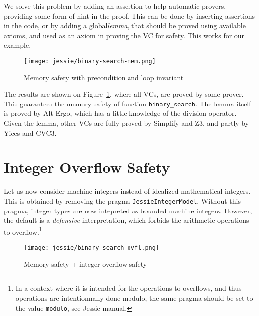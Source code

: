 \documentclass[a4paper,11pt,twoside,openright]{report}
\newcommand{\negtenthspace}{\hspace*{-0.1\linewidth}}
\begin{document}
We solve this problem by adding an assertion to help automatic
provers, providing some form of hint in the proof. This can be done by
inserting assertions in the code, or by adding a global\emph{lemma}, that
should be proved using available axioms, and used as an axiom in
proving the VC for safety. This works for our example.



\begin{figure}[t]
  \begin{center}
    \texttt{[image: jessie/binary-search-mem.png]}
  \end{center}
  \caption{Memory safety with precondition and loop invariant}
  \label{fig:mem}
  \hrulefill
\end{figure}

The results are shown on Figure~\ref{fig:mem}, where all VCs, are
proved by some prover. This guarantees the memory safety of function
\verb|binary_search|. The lemma itself is proved by Alt-Ergo, which
has a little knowledge of the division operator. Given the lemma,
other VCs are fully proved by Simplify and Z3, and partly by Yices and
CVC3.



\section{Integer Overflow Safety}

Let us now consider machine integers instead of idealized mathematical
integers. This is obtained by removing the pragma
\texttt{JessieIntegerModel}.  Without this pragma, integer types are
now intepreted as bounded machine integers. However, the default is a
\emph{defensive} interpretation, which forbids the arithmetic
operations to overflow.\footnote{In a context where it is intended for
  the operations to overflows, and thus operations are intentionnally
  done modulo, the same pragma should be set to the value
  \texttt{modulo}, see Jessie manual.}

\begin{figure}[t]
  \begin{center}
    \negtenthspace\texttt{[image: jessie/binary-search-ovfl.png]}
  \end{center}
  \caption{Memory safety + integer overflow safety}
  \label{fig:ovfl}
  \hrulefill
\end{figure}
\end{document}
